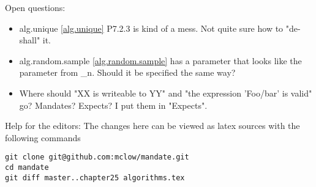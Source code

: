Open questions:
\begin{itemize}
\item{alg.unique \ref{alg.unique} P7.2.3 is kind of a mess. Not quite sure how to "de-shall" it.}
\item{alg.random.sample \ref{alg.random.sample} has a  parameter that looks like the  parameter from \*_n. Should it be specified the same way?}
\item{Where should "XX is writeable to YY" and "the expression 'Foo/bar' is valid" go? Mandates? Expects? I put them in "Expects".}
\end{itemize}



\vfill
Help for the editors: The changes here can be viewed as latex sources with the following commands
\begin{verbatim}
git clone git@github.com:mclow/mandate.git
cd mandate
git diff master..chapter25 algorithms.tex
\end{verbatim}
